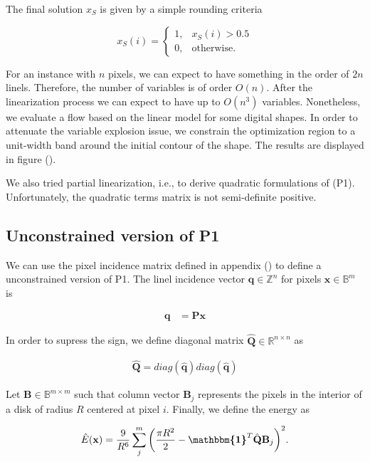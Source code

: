 	The final solution $x_S$ is given by a simple rounding criteria
	
\[
	x_S(i) = \left\{ \begin{array}{ll}

		 	1,& x_S(i) > 0.5\\
		 	0,& \text{otherwise}.
 	
	\end{array}\right.
\]	

	For an instance with $n$ pixels, we can expect to have something in the order of $2n$ linels. Therefore, the number of variables is of order $O(n)$. After the linearization process we can expect to have up to $O(n^3)$ variables. Nonetheless, we evaluate a flow based on the linear model for some digital shapes. In order to attenuate the variable explosion issue, we constrain the optimization region to a unit-width band around the initial contour of the shape. The results are displayed in figure ().
	
	We also tried partial linearization, i.e., to derive quadratic formulations of (P1). Unfortunately, the quadratic terms matrix is not semi-definite positive. 
	


\subsection{Unconstrained version of P1}

We can use the pixel incidence matrix defined in appendix () to define a unconstrained version of P1. The linel incidence vector $\mathbf{q} \in \mathbb{Z}^n$ for pixels $\mathbf{x} \in \mathbb{B}^{m}$ is 
	
	\begin{align*}
		\mathbf{q} &= \mathbf{P} \mathbf{x}
	\end{align*}

In order to supress the sign, we define diagonal matrix $\mathbf{\hat{Q}} \in \mathbb{R}^{n \times n }$ as

\begin{align*}
	\mathbf{\hat{Q}} = diag(\mathbf{\hat{q}})diag(\mathbf{\hat{q}})
\end{align*}

Let $\mathbf{B} \in \mathbb{B}^{m\times m}$ such that column vector $\mathbf{B}_j$ represents the pixels in the interior of a disk of radius $R$ centered at pixel $i$. Finally, we define the energy as

\begin{align}
	\hat{E}(\mathbf{x}) = \frac{9}{R^6}\sum_{j}^{m}{\left( \frac{\pi R^2}{2} - \boldsymbol{\mathbbm{1}}^T\hat{\mathbf{Q}}\mathbf{B}_j \right)^2}.
	\label{eq:unconstrained-digital-elastica}
\end{align}


